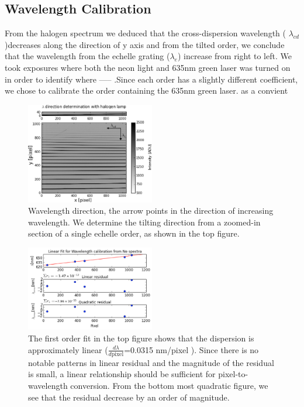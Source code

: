 \documentclass[authoryear, 12pt,5p, times]{elsarticle}
\begin{document}
\subsection{Wavelength Calibration}
From the halogen spectrum we deduced that the cross-dispersion wavelength ( $\lambda_{cd}$)decreases along the direction of y axis and from the tilted order, we conclude that the wavelength from the echelle grating ($\lambda_{e}$) increase from right to left.
We took exposures where both the neon light and 635nm green laser was turned on in order to identify  where ----- .Since each order has a slightly different coefficient, we chose to calibrate the order containing the 635nm green laser. as a convient 
\begin{figure}[h!]
\includegraphics[width=0.5\textwidth]{figures/lambda_direction}
\caption{Wavelength direction, the arrow points in the direction of increasing wavelength. We determine the tilting direction from a zoomed-in section of a single echelle  order, as shown in the top figure.}
\label{lambda_direction}
\end{figure}
 \begin{figure}[h!]
\includegraphics[width=0.5\textwidth]{figures/wavelength_calib}
\caption{The first order fit in the top figure shows that the dispersion is approximately linear ($\frac{d\lambda}{d\text{pixel}}$=0.0315 nm/pixel ). Since there is no notable patterns in linear residual and the magnitude of the residual is small, a linear relationship should be sufficient for pixel-to-wavelength conversion. From the bottom most quadratic figure, we see that the residual decrease by an order of magnitude.}
\label{calib}
\end{figure}
\end{document}
